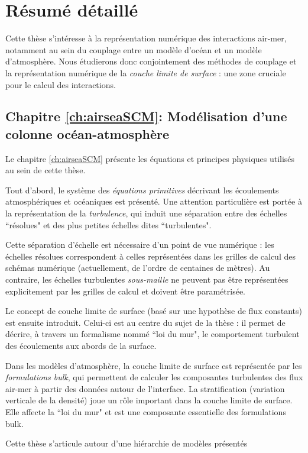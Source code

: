 \chapter*{Résumé détaillé}
Cette thèse s'intéresse à la représentation
numérique des interactions air-mer, notamment au sein
du couplage entre un modèle d'océan et un modèle d'atmosphère.
Nous étudierons donc conjointement des méthodes de couplage
et la représentation numérique de la
\textit{couche limite de surface} :
une zone cruciale pour le calcul des interactions.
%
\section*{Chapitre \ref{ch:airseaSCM}: Modélisation d'une colonne
océan-atmosphère}
Le chapitre \ref{ch:airseaSCM} présente les équations et
principes physiques utilisés
au sein de cette thèse.
\par
Tout d'abord, le système des \textit{équations primitives}
décrivant les écoulements atmosphériques et océaniques est présenté.
Une attention particulière est portée à la représentation de la
\textit{turbulence}, qui induit une séparation entre des échelles
``résolues" et des plus petites échelles dites ``turbulentes".
\par
Cette séparation d'échelle est nécessaire d'un point de vue
numérique : les échelles résolues correspondent à celles représentées
dans les grilles de calcul des schémas numérique (actuellement,
de l'ordre de centaines de mètres). Au contraire, les échelles
turbulentes \textit{sous-maille} ne peuvent pas être représentées
explicitement par les grilles de calcul et doivent être paramétrisée.
\par
Le concept de couche limite de surface
(basé sur une hypothèse de flux constants) est ensuite introduit.
Celui-ci est au centre du sujet de la thèse : il permet de décrire,
à travers un formalisme nommé ``loi du mur",
le comportement turbulent des écoulements aux abords de la surface.
\par
Dans les modèles d'atmosphère, la couche limite de surface est
représentée par les \textit{formulations bulk},
qui permettent de calculer les composantes
turbulentes des flux air-mer à partir des données autour de
l'interface.
La stratification (variation verticale de la densité) joue un rôle
important dans la couche limite de surface. Elle affecte la
``loi du mur" et est une composante essentielle des formulations
bulk.
\par
Cette thèse s'articule autour d'une hiérarchie de modèles présentés
